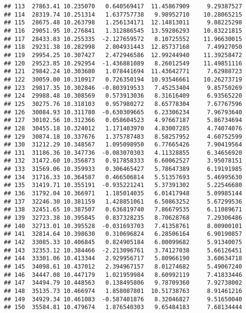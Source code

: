 \documentclass[
]{article}
\begin{document}
\begin{verbatim}
## 113  27863.41 10.235070   0.640569417  11.45867909     9.29387527
## 114  28319.74 10.251314   1.637757738   9.98952710    10.28065215
## 115  28675.48 10.263798   1.256134171  12.14813011     9.08225298
## 116  29051.95 10.276841   1.312886545  13.59286293    10.83221815
## 117  28433.83 10.255335  -2.127659572   8.10725552    11.96630015
## 118  29231.38 10.282998   2.804931443  12.85737168     7.49927050
## 119  29954.25 10.307427   2.472946586  12.99244940    11.39258472
## 120  29523.85 10.292954  -1.436881089   8.26012549    11.49851116
## 121  29842.24 10.303680   1.078441694  11.43642771     7.62988723
## 122  30059.00 10.310917   0.726350194  10.93546661    10.26273719
## 123  29817.35 10.302846  -0.803919533   7.45253404     9.85750269
## 124  29988.48 10.308569   0.573913036   8.31616409     6.93565220
## 125  30275.76 10.318103   0.957980272   8.65778304     7.67767596
## 126  30084.93 10.311780  -0.630309665   6.23306234     7.96793640
## 127  30102.56 10.312366   0.058604523   4.97667187     5.86734694
## 128  30455.18 10.324012   1.171403970   4.83007285     4.74074076
## 129  30874.18 10.337676   1.375787483   8.58257952     4.60752599
## 130  31212.29 10.348567   1.095098950   6.77665426     7.90419564
## 131  31186.36 10.347736  -0.083070303   4.11328855     6.34656920
## 132  31472.60 10.356873   0.917858333   6.60062527     3.95078151
## 133  31569.06 10.359933   0.306465427   5.78647389     6.19191985
## 134  31716.33 10.364587   0.466506814   5.51357693     5.46995630
## 135  31419.71 10.355191  -0.935221241   5.37391302     5.22546680
## 136  31792.04 10.366971   1.185014035   6.01417948     5.09985144
## 137  32246.30 10.381159   1.428851061   6.50863252     5.67299536
## 138  32451.65 10.387507   0.636819740   7.86679535     6.11089671
## 139  32723.38 10.395845   0.837328235   8.70628768     7.29306486
## 140  32713.01 10.395528  -0.031693703   7.41358761     8.00900101
## 141  32814.64 10.398630   0.310696824   6.28506164     6.90190857
## 142  33085.33 10.406845   0.824905184   6.00099682     5.91340075
## 143  32353.12 10.384466  -2.213096761   3.74127038     5.66126451
## 144  33301.06 10.413344   2.929956717   5.80966190     3.60634718
## 145  34098.61 10.437012   2.394967157   8.01274682     5.49067240
## 146  34447.08 10.447179   1.021959984   8.60992119     7.41833446
## 147  34494.79 10.448563   0.138495806   9.78709360     7.92738002
## 148  35135.73 10.466974   1.858087801  10.51738763     8.91461216
## 149  34929.34 10.461083  -0.587401876   8.32046827     9.51650040
## 150  35584.81 10.479674   1.876540303   9.65484183     7.68134444

\end{verbatim}
\end{document}
